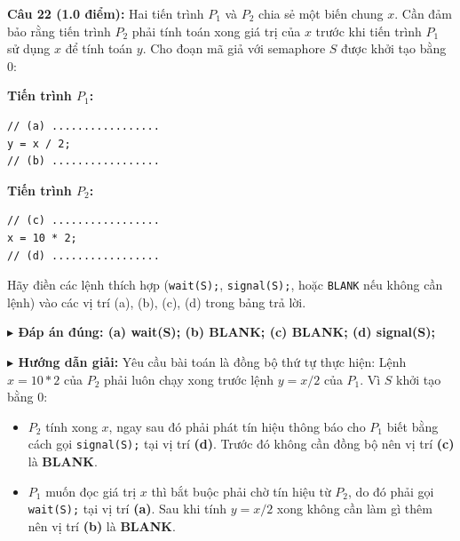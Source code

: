 \documentclass[11pt,a4paper]{article}
\newcommand{\giaithich}[2]{%
    \par\vspace{0.15cm}\noindent
    \begingroup\small
    \noindent\textbf{\color{blue}$\blacktriangleright$ Đáp án đúng: #1} \par\vspace{0.08cm}
    \noindent\textbf{\color{teal}$\blacktriangleright$ Hướng dẫn giải:} #2
    \endgroup\par\vspace{0.35cm}
}
\begin{document}
\vspace{0.3cm}
\noindent\textbf{Câu 22 (1.0 điểm):}
Hai tiến trình $P_1$ và $P_2$ chia sẻ một biến chung $x$. Cần đảm bảo rằng tiến trình $P_2$ phải tính toán xong giá trị của $x$ trước khi tiến trình $P_1$ sử dụng $x$ để tính toán $y$.
Cho đoạn mã giả với semaphore $S$ được khởi tạo bằng 0:

\vspace{0.2cm}
\noindent
\begin{minipage}[t]{0.45\textwidth}
\textbf{Tiến trình $P_1$:}
\begin{verbatim}
// (a) .................
y = x / 2;
// (b) .................
\end{verbatim}
\end{minipage}
\hfill
\begin{minipage}[t]{0.45\textwidth}
\textbf{Tiến trình $P_2$:}
\begin{verbatim}
// (c) .................
x = 10 * 2;
// (d) .................
\end{verbatim}
\end{minipage}

\vspace{0.3cm}
\noindent Hãy điền các lệnh thích hợp (\texttt{wait(S);}, \texttt{signal(S);}, hoặc \texttt{BLANK} nếu không cần lệnh) vào các vị trí (a), (b), (c), (d) trong bảng trả lời.
\giaithich{(a) wait(S); (b) BLANK; (c) BLANK; (d) signal(S);}{Yêu cầu bài toán là đồng bộ thứ tự thực hiện: Lệnh $x = 10 * 2$ của $P_2$ phải luôn chạy xong trước lệnh $y = x / 2$ của $P_1$.
Vì $S$ khởi tạo bằng 0:
\begin{itemize}[noitemsep,topsep=1pt]
    \item $P_2$ tính xong $x$, ngay sau đó phải phát tín hiệu thông báo cho $P_1$ biết bằng cách gọi \texttt{signal(S);} tại vị trí \textbf{(d)}. Trước đó không cần đồng bộ nên vị trí \textbf{(c)} là \textbf{BLANK}.
    \item $P_1$ muốn đọc giá trị $x$ thì bắt buộc phải chờ tín hiệu từ $P_2$, do đó phải gọi \texttt{wait(S);} tại vị trí \textbf{(a)}. Sau khi tính $y = x / 2$ xong không cần làm gì thêm nên vị trí \textbf{(b)} là \textbf{BLANK}.
\end{itemize}}
\end{document}
